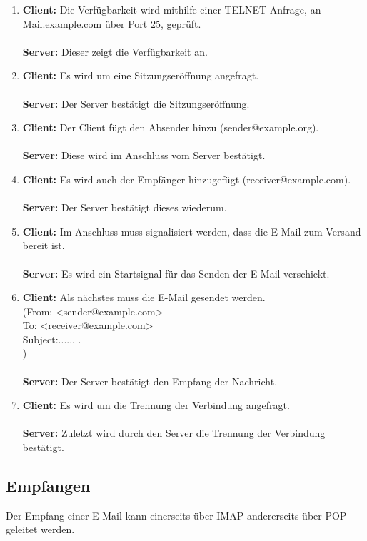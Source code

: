 \documentclass[12pt,a4paper]{report}
\begin{document}
\begin{onehalfspace}
\begin{enumerate}
\item \textbf{Client:} Die Verfügbarkeit wird mithilfe einer TELNET-Anfrage, an Mail.example.com über Port 25, geprüft.\\\\
\textbf{Server:} Dieser zeigt die Verfügbarkeit an. 
\item \textbf{Client:} Es wird um eine Sitzungseröffnung angefragt. \\\\
\textbf{Server:} Der Server bestätigt die Sitzungseröffnung. 
\item \textbf{Client:} Der Client fügt den Absender hinzu (sender@example.org).\\\\
\textbf{Server:} Diese wird im Anschluss vom Server bestätigt. 
\item \textbf{Client:} Es wird auch der Empfänger hinzugefügt (receiver@example.com).\\\\
\textbf{Server:} Der Server bestätigt dieses wiederum. 
\item \textbf{Client:} Im Anschluss muss signalisiert werden, dass die E-Mail zum Versand bereit ist. \\\\
\textbf{Server:} Es wird ein Startsignal für das Senden der E-Mail verschickt.
\item \textbf{Client:} Als nächstes muss die E-Mail gesendet werden. \\
(From: <sender@example.com>\\
To: <receiver@example.com>\\
Subject:......
.\\
)\\\\
\textbf{Server:} Der Server bestätigt den Empfang der Nachricht. 
\item \textbf{Client:} Es wird um die Trennung der Verbindung angefragt.\\\\
\textbf{Server:} Zuletzt wird durch den Server die Trennung der Verbindung bestätigt.
\end{enumerate}
\subsection{Empfangen}
Der Empfang einer E-Mail kann einerseits über IMAP andererseits über POP geleitet werden. 

\end{onehalfspace}
\end{document}
